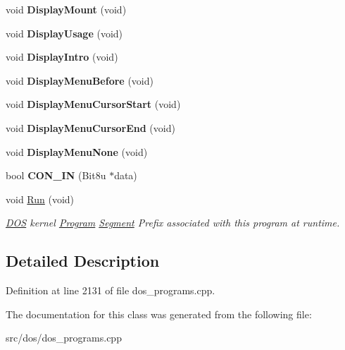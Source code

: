 \begin{DoxyCompactItemize}
\item 
\hypertarget{classINTRO_a5c6e294e686b9c667e58bd2ca8e13bb4}{void {\bfseries Display\-Mount} (void)}\label{classINTRO_a5c6e294e686b9c667e58bd2ca8e13bb4}

\item 
\hypertarget{classINTRO_a4857619c9d351417a9a8c87b29bed52c}{void {\bfseries Display\-Usage} (void)}\label{classINTRO_a4857619c9d351417a9a8c87b29bed52c}

\item 
\hypertarget{classINTRO_a3e68c8cde2fce914c656154f273f7149}{void {\bfseries Display\-Intro} (void)}\label{classINTRO_a3e68c8cde2fce914c656154f273f7149}

\item 
\hypertarget{classINTRO_a0c242eac779e67c6168613e6b2a81290}{void {\bfseries Display\-Menu\-Before} (void)}\label{classINTRO_a0c242eac779e67c6168613e6b2a81290}

\item 
\hypertarget{classINTRO_a53f19e5f292278bcd847a8a44b0bdc5d}{void {\bfseries Display\-Menu\-Cursor\-Start} (void)}\label{classINTRO_a53f19e5f292278bcd847a8a44b0bdc5d}

\item 
\hypertarget{classINTRO_a3ed7b89911f2fbd3f0b5a8412d9d91c5}{void {\bfseries Display\-Menu\-Cursor\-End} (void)}\label{classINTRO_a3ed7b89911f2fbd3f0b5a8412d9d91c5}

\item 
\hypertarget{classINTRO_a83e703c1fe7702783fbd1ce1320235a6}{void {\bfseries Display\-Menu\-None} (void)}\label{classINTRO_a83e703c1fe7702783fbd1ce1320235a6}

\item 
\hypertarget{classINTRO_ab717779f33410fb437dfb3b82fcf8e65}{bool {\bfseries C\-O\-N\-\_\-\-I\-N} (Bit8u $\ast$data)}\label{classINTRO_ab717779f33410fb437dfb3b82fcf8e65}

\item 
\hypertarget{classINTRO_a7fe083b2cab4fe79e280b030cc542fd3}{void \hyperlink{classINTRO_a7fe083b2cab4fe79e280b030cc542fd3}{Run} (void)}\label{classINTRO_a7fe083b2cab4fe79e280b030cc542fd3}

\begin{DoxyCompactList}\small\item\em \hyperlink{classDOS}{D\-O\-S} kernel \hyperlink{classProgram}{Program} \hyperlink{structSegment}{Segment} Prefix associated with this program at runtime. \end{DoxyCompactList}\end{DoxyCompactItemize}


\subsection{Detailed Description}


Definition at line 2131 of file dos\-\_\-programs.\-cpp.



The documentation for this class was generated from the following file\-:\begin{DoxyCompactItemize}
\item 
src/dos/dos\-\_\-programs.\-cpp\end{DoxyCompactItemize}
